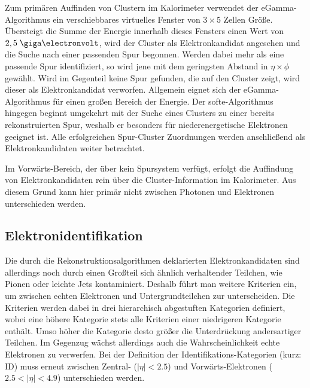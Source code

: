 Zum primären Auffinden von Clustern im Kalorimeter verwendet der
eGamma-Algorithmus ein verschiebbares virtuelles Fenster von $3\times5$ Zellen
Größe. Übersteigt die Summe der Energie innerhalb dieses Fensters einen Wert
von $2,5\GeV$, wird der Cluster als Elektronkandidat angesehen und die Suche
nach einer passenden Spur begonnen. Werden dabei mehr als eine passende Spur
identifiziert, so wird jene mit dem geringsten Abstand in $\eta\times\phi$
gewählt. Wird im Gegenteil keine Spur gefunden, die auf den Cluster zeigt, wird
dieser als Elektronkandidat verworfen. Allgemein eignet sich der
eGamma-Algorithmus für einen großen Bereich der Energie. Der softe-Algorithmus
hingegen beginnt umgekehrt mit der Suche eines Clusters zu einer bereits
rekonstruierten Spur, weshalb er besonders für niederenergetische Elektronen
geeignet ist. Alle erfolgreichen Spur-Cluster Zuordnungen werden anschließend
als Elektronkandidaten weiter betrachtet.

Im Vorwärts-Bereich, der über kein Spursystem verfügt, erfolgt die Auffindung
von Elektronkandidaten rein über die Cluster-Information im Kalorimeter. Aus
diesem Grund kann hier primär nicht zwischen Photonen und Elektronen
unterschieden werden.



\subsection{Elektronidentifikation}
\label{identification}
Die durch die Rekonstruktionsalgorithmen deklarierten Elektronkandidaten
sind allerdings noch durch einen Großteil sich ähnlich verhaltender Teilchen,
wie Pionen oder leichte Jets kontaminiert. Deshalb führt man weitere Kriterien
ein, um zwischen echten Elektronen und Untergrundteilchen zur unterscheiden.
Die Kriterien werden dabei in drei hierarchisch abgestuften Kategorien
definiert, wobei eine höhere Kategorie stets alle Kriterien einer niedrigeren
Kategorie enthält. Umso höher die Kategorie desto größer die Unterdrückung
andersartiger Teilchen. Im Gegenzug wächst allerdings auch die
Wahrscheinlichkeit echte Elektronen zu verwerfen. Bei der Definition der
Identifikations-Kategorien (kurz: \acs{ID}) muss erneut zwischen Zentral-
($|\eta|<2.5$) und Vorwärts-Elektronen ($2.5<|\eta|<4.9$) unterschieden werden.

